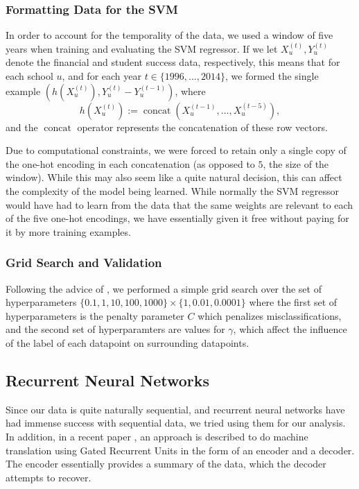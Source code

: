 \documentclass[paper.tex]{subfiles}
\begin{document}
\subsubsection{Formatting Data for the SVM}
In order to account for the temporality of the data, we used a window of five years when training and evaluating the SVM regressor. If we let $X_u^{(t)}, Y_u^{(t)}$ denote the financial and student success data, respectively, this means that for each school $u$, and for each year $t \in \{1996, ..., 2014\}$, we formed the single example $(h(X_u^{(t)}), Y_u^{(t)} - Y_u^{(t - 1)})$, where \[ h(X_u^{(t)}) := \operatorname{concat}(X_u^{(t - 1)}, ..., X_u^{(t - 5)}), \] and the $\operatorname{concat}$ operator represents the concatenation of these row vectors. 

Due to computational constraints, we were forced to retain only a single copy of the one-hot encoding in each concatenation (as opposed to $5$, the size of the window). While this may also seem like a quite natural decision, this can affect the complexity of the model being learned. While normally the SVM regressor would have had to learn from the data that the same weights are relevant to each of the five one-hot encodings, we have essentially given it free without paying for it by more training examples. 

\subsubsection{Grid Search and Validation}
Following the advice of \cite{chang2011}, we performed a simple grid search over the set of hyperparameters $\{ 0.1, 1, 10, 100, 1000 \} \times \{ 1, 0.01, 0.0001 \}$ where the first set of hyperparameters is the penalty parameter $C$ which penalizes misclassifications, and the second set of hyperparamters are values for $\gamma$, which affect the influence of the label of each datapoint on surrounding datapoints. 


\subsection{Recurrent Neural Networks} Since our data is quite naturally sequential, and recurrent neural networks have had immense success with sequential data, we tried using them for our analysis. In addition, in a recent paper \cite{cho}, an approach is described to do machine translation using Gated Recurrent Units in the form of an encoder and a decoder. The encoder essentially provides a summary of the data, which the decoder attempts to recover.
\end{document}
